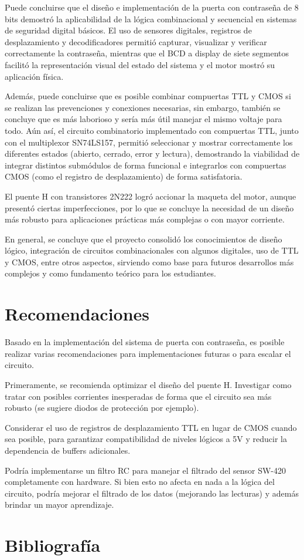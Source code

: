 \documentclass[conference]{IEEEtran}  %
\begin{document}
Puede concluirse que el diseño e implementación de la puerta con contraseña de 8 bits demostró la aplicabilidad de la lógica combinacional y secuencial en sistemas de seguridad digital básicos. El uso de sensores digitales, registros de desplazamiento y decodificadores permitió capturar, visualizar y verificar correctamente la contraseña, mientras que el BCD a display de siete segmentos facilitó la representación visual del estado del sistema y el motor mostró su aplicación física. 

Además, puede concluirse que es posible combinar compuertas TTL y CMOS si se realizan las prevenciones y conexiones necesarias, sin embargo, también se concluye que es más laborioso y sería más útil manejar el mismo voltaje para todo. Aún así, el circuito combinatorio implementado con compuertas TTL, junto con el multiplexor SN74LS157, permitió seleccionar y mostrar correctamente los diferentes estados (abierto, cerrado, error y lectura), demostrando la viabilidad de integrar distintos submódulos de forma funcional e integrarlos con compuertas CMOS (como el registro de desplazamiento) de forma satisfatoria. 

El puente H con transistores 2N222 logró accionar la maqueta del motor, aunque presentó ciertas imperfecciones, por lo que se concluye la necesidad de un diseño más robusto para aplicaciones prácticas más complejas o con mayor corriente.

En general, se concluye que el proyecto consolidó los conocimientos de diseño lógico, integración de circuitos combinacionales con algunos digitales, uso de TTL y CMOS, entre otros aspectos, sirviendo como base para futuros desarrollos más complejos y como fundamento teórico para los estudiantes.

\section{Recomendaciones}

Basado en la implementación del sistema de puerta con contraseña, es posible realizar varias recomendaciones para implementaciones futuras o para escalar el circuito.

Primeramente, se recomienda optimizar el diseño del puente H. Investigar como tratar con posibles corrientes inesperadas de forma que el circuito sea más robusto (se sugiere diodos de protección por ejemplo).

Considerar el uso de registros de desplazamiento TTL en lugar de CMOS cuando sea posible, para garantizar compatibilidad de niveles lógicos a 5V y reducir la dependencia de buffers adicionales.

Podría implementarse un filtro RC para manejar el filtrado del sensor SW-420 completamente con hardware. Si bien esto no afecta en nada a la lógica del circuito, podría mejorar el filtrado de los datos (mejorando las lecturas) y además brindar un mayor aprendizaje.


\section*{Bibliografía}

\end{document}
